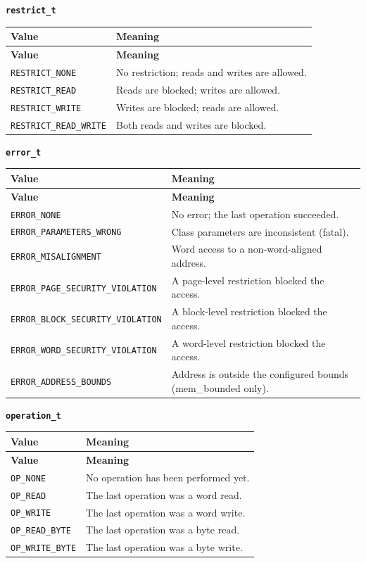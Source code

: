 \documentclass[11pt,letterpaper]{report}
\begin{document}
\noindent\textbf{\texttt{restrict\_t}}

\begin{xltabular}{\linewidth}{lX}
\toprule
\textbf{Value} & \textbf{Meaning} \\
\midrule
\endfirsthead
\toprule
\textbf{Value} & \textbf{Meaning} \\
\midrule
\endhead
\bottomrule
\endlastfoot
\texttt{RESTRICT\_NONE} & No restriction; reads and writes are allowed. \\
\texttt{RESTRICT\_READ} & Reads are blocked; writes are allowed. \\
\texttt{RESTRICT\_WRITE} & Writes are blocked; reads are allowed. \\
\texttt{RESTRICT\_READ\_WRITE} & Both reads and writes are blocked. \\
\end{xltabular}

\noindent\textbf{\texttt{error\_t}}

\begin{xltabular}{\linewidth}{lX}
\toprule
\textbf{Value} & \textbf{Meaning} \\
\midrule
\endfirsthead
\toprule
\textbf{Value} & \textbf{Meaning} \\
\midrule
\endhead
\bottomrule
\endlastfoot
\texttt{ERROR\_NONE} & No error; the last operation succeeded. \\
\texttt{ERROR\_PARAMETERS\_WRONG} & Class parameters are inconsistent (fatal). \\
\texttt{ERROR\_MISALIGNMENT} & Word access to a non-word-aligned address. \\
\texttt{ERROR\_PAGE\_SECURITY\_VIOLATION} & A page-level restriction blocked the access. \\
\texttt{ERROR\_BLOCK\_SECURITY\_VIOLATION} & A block-level restriction blocked the access. \\
\texttt{ERROR\_WORD\_SECURITY\_VIOLATION} & A word-level restriction blocked the access. \\
\texttt{ERROR\_ADDRESS\_BOUNDS} & Address is outside the configured bounds (mem\_bounded only). \\
\end{xltabular}

\noindent\textbf{\texttt{operation\_t}}

\begin{xltabular}{\linewidth}{lX}
\toprule
\textbf{Value} & \textbf{Meaning} \\
\midrule
\endfirsthead
\toprule
\textbf{Value} & \textbf{Meaning} \\
\midrule
\endhead
\bottomrule
\endlastfoot
\texttt{OP\_NONE} & No operation has been performed yet. \\
\texttt{OP\_READ} & The last operation was a word read. \\
\texttt{OP\_WRITE} & The last operation was a word write. \\
\texttt{OP\_READ\_BYTE} & The last operation was a byte read. \\
\texttt{OP\_WRITE\_BYTE} & The last operation was a byte write. \\
\end{xltabular}
\end{document}
